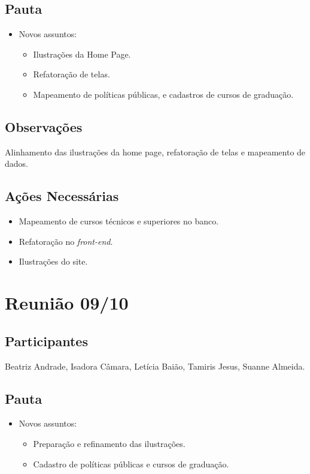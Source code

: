 \begin{apendicesenv}
\subsection*{Pauta}
\begin{itemize}
    \item Novos assuntos:
    \begin{itemize}
        \item Ilustrações da Home Page.
        \item Refatoração de telas.
        \item Mapeamento de políticas públicas, e cadastros de cursos de graduação.
    \end{itemize}
\end{itemize}

\subsection*{Observações}
 Alinhamento das ilustrações da home page, refatoração de telas e mapeamento de dados.

\subsection*{Ações Necessárias}
\begin{itemize}
    \item Mapeamento de cursos técnicos e superiores no banco.
    \item Refatoração no \textit{front-end}.
    \item Ilustrações do site.
\end{itemize}

\section*{Reunião 09/10}

\subsection*{Participantes}
Beatriz Andrade, Isadora Câmara, Letícia Baião, Tamiris Jesus, Suanne Almeida.

\subsection*{Pauta}
\begin{itemize}
    \item Novos assuntos:
    \begin{itemize}
        \item Preparação e refinamento das ilustrações.
        \item Cadastro de políticas públicas e cursos de graduação.
    \end{itemize}
\end{itemize}


\end{apendicesenv}
